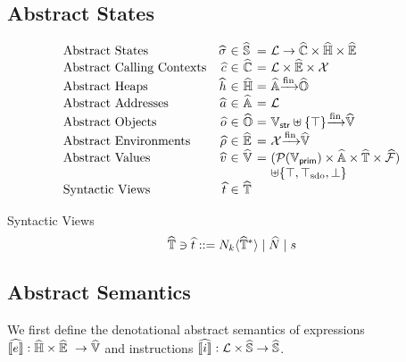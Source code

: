 \subsection{Abstract States}
\[
  \begin{array}{lr@{~}c@{~}l@{~}c@{~}l}
    \text{Abstract States} & \astate &\in& \astset &=&
    \labset \rightarrow \actxtset \times \aheapset \times \aenvset\\

    \text{Abstract Calling Contexts} & \actxt &\in& \actxtset &=&
    \labset \times \aenvset \times \varset\\

    \text{Abstract Heaps} & \aheap &\in& \aheapset &=&
    \aaddrset \finmap \aobjset\\

    \text{Abstract Addresses} & \aaddr &\in& \aaddrset &=&
    \labset\\

    \text{Abstract Objects} & \aobj &\in& \aobjset &=&
    \strset \uplus \{ \top \} \finmap \avalset\\

    \text{Abstract Environments} & \aenv &\in& \aenvset &=&
    \varset \finmap \avalset\\

    \text{Abstract Values} & \aval &\in& \avalset &=&
    (\powerset{\pvalset} \times \aaddrset \times \atreeset \times \afuncset)\\
    &&&&&\uplus \{ \top, \sdotop, \bot \}\\

    \text{Syntactic Views} & \atree &\in& \atreeset\\
  \end{array}
\]

Syntactic Views
\[
  \widehat{\mathbb{T}} \ni \widehat{t} ::= N_k \langle \widehat{\mathbb{T}}^* \rangle \mid \widehat{N} \mid s
\]


\subsection{Abstract Semantics}
We first define the denotational abstract semantics of expressions
$\asem{\expr}: \aheapset \times \aenvset \ \rightarrow \avalset$
and instructions
$\widehat{\llbracket{i}\rrbracket}: \mathcal{L} \times \widehat{\mathbb{S}} \rightarrow \widehat{\mathbb{S}}$.

